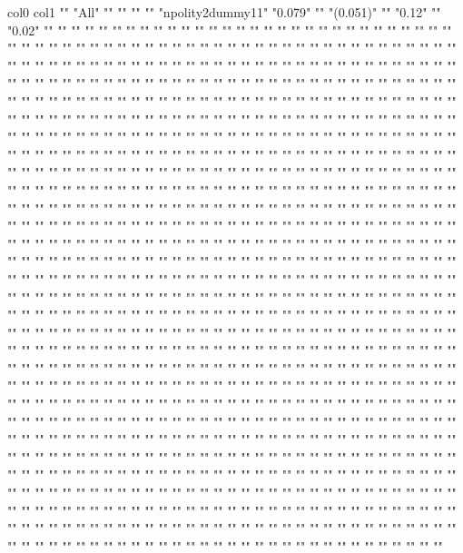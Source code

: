 col0	col1
""	"All"
""	""
""	""
"npolity2dummy11"	"0.079"
""	"(0.051)"
""	"0.12"
""	"0.02"
""	""
""	""
""	""
""	""
""	""
""	""
""	""
""	""
""	""
""	""
""	""
""	""
""	""
""	""
""	""
""	""
""	""
""	""
""	""
""	""
""	""
""	""
""	""
""	""
""	""
""	""
""	""
""	""
""	""
""	""
""	""
""	""
""	""
""	""
""	""
""	""
""	""
""	""
""	""
""	""
""	""
""	""
""	""
""	""
""	""
""	""
""	""
""	""
""	""
""	""
""	""
""	""
""	""
""	""
""	""
""	""
""	""
""	""
""	""
""	""
""	""
""	""
""	""
""	""
""	""
""	""
""	""
""	""
""	""
""	""
""	""
""	""
""	""
""	""
""	""
""	""
""	""
""	""
""	""
""	""
""	""
""	""
""	""
""	""
""	""
""	""
""	""
""	""
""	""
""	""
""	""
""	""
""	""
""	""
""	""
""	""
""	""
""	""
""	""
""	""
""	""
""	""
""	""
""	""
""	""
""	""
""	""
""	""
""	""
""	""
""	""
""	""
""	""
""	""
""	""
""	""
""	""
""	""
""	""
""	""
""	""
""	""
""	""
""	""
""	""
""	""
""	""
""	""
""	""
""	""
""	""
""	""
""	""
""	""
""	""
""	""
""	""
""	""
""	""
""	""
""	""
""	""
""	""
""	""
""	""
""	""
""	""
""	""
""	""
""	""
""	""
""	""
""	""
""	""
""	""
""	""
""	""
""	""
""	""
""	""
""	""
""	""
""	""
""	""
""	""
""	""
""	""
""	""
""	""
""	""
""	""
""	""
""	""
""	""
""	""
""	""
""	""
""	""
""	""
""	""
""	""
""	""
""	""
""	""
""	""
""	""
""	""
""	""
""	""
""	""
""	""
""	""
""	""
""	""
""	""
""	""
""	""
""	""
""	""
""	""
""	""
""	""
""	""
""	""
""	""
""	""
""	""
""	""
""	""
""	""
""	""
""	""
""	""
""	""
""	""
""	""
""	""
""	""
""	""
""	""
""	""
""	""
""	""
""	""
""	""
""	""
""	""
""	""
""	""
""	""
""	""
""	""
""	""
""	""
""	""
""	""
""	""
""	""
""	""
""	""
""	""
""	""
""	""
""	""
""	""
""	""
""	""
""	""
""	""
""	""
""	""
""	""
""	""
""	""
""	""
""	""
""	""
""	""
""	""
""	""
""	""
""	""
""	""
""	""
""	""
""	""
""	""
""	""
""	""
""	""
""	""
""	""
""	""
""	""
""	""
""	""
""	""
""	""
""	""
""	""
""	""
""	""
""	""
""	""
""	""
""	""
""	""
""	""
""	""
""	""
""	""
""	""
""	""
""	""
""	""
""	""
""	""
""	""
""	""
""	""
""	""
""	""
""	""
""	""
""	""
""	""
""	""
""	""
""	""
""	""
""	""
""	""
""	""
""	""
""	""
""	""
""	""
""	""
""	""
""	""
""	""
""	""
""	""
""	""
""	""
""	""
""	""
""	""
""	""
""	""
""	""
""	""
""	""
""	""
""	""
""	""
""	""
""	""
""	""
""	""
""	""
""	""
""	""
""	""
""	""
""	""
""	""
""	""
""	""
""	""
""	""
""	""
""	""
""	""
""	""
""	""
""	""
""	""
""	""
""	""
""	""
""	""
""	""
""	""
""	""
""	""
""	""
""	""
""	""
""	""
""	""
""	""
""	""
""	""
""	""
""	""
""	""
""	""
""	""
""	""
""	""
""	""
""	""
""	""
""	""
""	""
""	""
""	""
""	""
""	""
""	""
""	""
""	""
""	""
""	""
""	""
""	""
""	""
""	""
""	""
""	""
""	""
""	""
""	""
""	""
""	""
""	""
""	""
""	""
""	""
""	""
""	""
""	""
""	""
""	""
""	""
""	""
""	""
""	""
""	""
""	""
""	""
""	""
""	""
""	""
""	""
""	""
""	""
""	""
""	""
""	""
""	""
""	""
""	""
""	""
""	""
""	""
""	""
""	""
""	""
""	""
""	""
""	""
""	""
""	""
""	""
""	""
""	""
""	""
""	""
""	""
""	""
""	""
""	""
""	""
""	""
""	""
""	""
""	""
""	""
""	""
""	""
""	""
""	""
""	""
""	""
""	""
""	""
""	""
""	""
""	""
""	""
""	""
""	""
""	""
""	""
""	""
""	""
""	""
""	""
""	""
""	""
""	""
""	""
""	""
""	""
""	""
""	""
""	""
""	""
""	""
""	""
""	""
